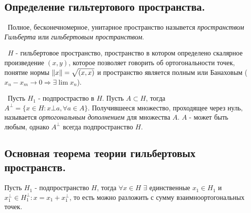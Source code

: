 \subsection*{Определение гильтертового пространства.}

\noindent \textasteriskcentered~Полное, бесконечномерное, унитарное пространство назывется \textit{пространством Гильберта} или \textit{гильбертовым пространством}.

\smallskip
\noindent \textasteriskcentered~$H$ - гильбертовое пространство, пространство в котором определено скалярное произведение $(x, y)$, которое позволяет говорить об 
ортогональности точек, 
понятие нормы $\left\lVert x\right\rVert = \sqrt{(x, x)}$ и пространство является полным или Банаховым ($x_n - x_m \to 0 \Rightarrow \exists \lim x_n$).

\bigskip
\noindent \textasteriskcentered~Пусть $H_1$ - подпростраство в $H$. Пусть $A \subset H$, тогда $A^{\bot} = \{ x \in H : x \bot a, \forall a \in A\}$.
Получившееся множество, проходящее через нуль, называется \textit{ортогональным дополнением} для множества $A$. $A$ - может быть любым, однако $A^\bot$ всегда подпространство $H$.



\subsection*{Основная теорема теории гильбертовых пространств.}

\begin{theorem*}
   Пусть $H_1$ - подпространство $H$, тогда $\forall x \in H$ $\exists$ единственные $x_1 \in H_1$ и $x_1^\bot \in H_1^\bot : x = x_1 + x_1^\bot$, то есть можно 
   разложить с сумму взаимноортогональных точек.
\end{theorem*}

